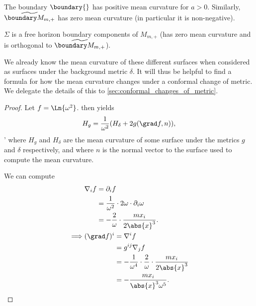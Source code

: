 \documentclass[titlepage,numbers=noenddot,headinclude,oneside,%
footinclude=true,cleardoublepage=empty,%
BCOR=5mm,paper=a4,fontsize=11pt,%
english,%
]{scrartcl}
\begin{document}
\begin{lemma}\label{lem:schwarzschild_spaces_are_asymptotically_flat}
    The boundary \( \boundary{} \) has positive mean curvature for \( a>0\). Similarly, \( \schwarzschildboundary \) has zero mean curvature (in particular it is non-negative).

    \( \Sigma \) is a free horizon boundary components of \( M_{m,+} \) (\ie has zero mean curvature and is orthogonal to \( \schwarzschildboundary \)). 
\end{lemma}
We already know the mean curvature of these different surfaces when considered as surfaces under the background metric \( \delta \). It will thus be helpful to find a formula for how the mean curvature changes under a conformal change of metric. We delegate the details of this to \cref{sec:conformal_changes_of_metric}.
\begin{proof}
    Let \( f=\Ln{\omega^2} \).  then yields
    \begin{equation*}
        H_{g}=\frac{1}{\omega^2}(H_{\delta}+2 g(\grad f,n)),
    \end{equation*}'
    where \( H_g \) and \( H_\delta \) are the mean curvature of some surface under the metrics \( g \) and \( \delta \) respectively, and where \( n \) is the normal vector to the surface used to compute the mean curvature.

    We can compute
    \begin{align*}
        &\nabla_i f\begin{aligned}[t]
            &=\partial_i f\\
            &=\frac{1}{\omega^2}\cdot2 \omega\cdot \partial_i \omega\\
            &=-\frac{2}{\omega}\cdot \frac{m x_i}{2\abs{x}^3}.
        \end{aligned}\\
        \implies &(\grad f)^i\begin{aligned}[t]
            &=\nabla^i f\\
            &=g^{ij}\nabla_j f\\
            &=-\frac{1}{\omega^4}\cdot \frac{2}{\omega}\cdot \frac{m x_i}{2\abs{x}^3}\\
            &=-\frac{m x_i}{\abs{x}^3 \omega^5}.
        \end{aligned}
    \end{align*}
    

\end{proof}
\end{document}
